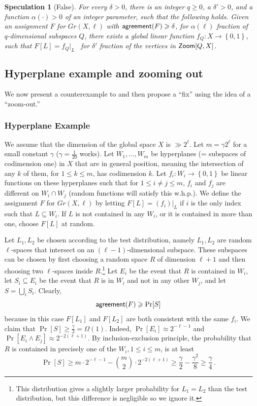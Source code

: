 \documentclass{toc}
\newtheorem{spec}[theorem]{Speculation}
\newcommand\set[1]{{\left\{ #1 \right\}}}
\renewcommand\geq{\geqslant}
\renewcommand\ge{\geqslant}
\renewcommand\leq{\leqslant}
\renewcommand\subset{\subseteq}
\newcommand{\Zoom}{{\sf Zoom}}
\def\agr{{\sf agreement}}
\begin{document}
\begin{spec}[False]\label{spec:2} For every %
 $\delta>0$, there
  is an integer $q \geq 0$, a
   $\delta' > 0$, and a function
 $\alpha(\cdot) > 0$ of an integer parameter,
 such that
the following holds. Given an assignment $F$ for $Gr(X,\ell)$ with $\agr(F)\ge\delta$, for $\alpha(\ell)$ fraction of $q$-dimensional subspaces $Q$,
there exists a global linear function $f_Q \colon X \to \set{0,1}$,
such that $F[L] = f_Q|_L$ ~for $\delta'$
fraction of the vertices in ${\Zoom}[Q, X]$.
\end{spec}


%
\subsection{Hyperplane example and zooming out}  %
\label{sec:counter-2}

We now present a counterexample to  and then propose a ``fix'' using the idea of a ``zoom-out.''

\subsubsection*{Hyperplane Example}
We assume that the dimension of the global space $X$ is $\gg 2^\ell$.
Let $m = \gamma 2^{\ell}$ for a small constant $\gamma$
($\gamma = \frac{1}{20}$ works). Let $W_1,...,W_{m}$ be hyperplanes (=
subspaces of codimension one) in $X$ that are in general position,
meaning the intersection of any $k$ of them, for $1 \leq k \leq m$,
has codimension $k$.  Let $f_i\colon W_i\to\set{0,1}$ be linear
functions on these hyperplanes such that for $1 \leq i\not=j \leq m$,
$f_i$ and $f_j$ are different on $W_i \cap W_j$ (random functions will
satisfy this w.h.p.).  We define the assignment $F$ for $Gr(X,\ell)$
by letting $F[L] = (f_i)|_{L}$ if $i$ is the only index such
that $L\subset W_i$. If $L$ is not contained in any $W_i$, or it is
contained in more than one, choose $F[L]$ at random.

Let $L_1,L_2$ be chosen according to the test distribution, namely $L_1,L_2$ are  random $\ell$-spaces that intersect on an
$(\ell-1)$-dimensional subspace. These subspaces can be chosen by first choosing a random space $R$ of dimension $\ell+1$ and then choosing two $\ell$-spaces inside $R$.\footnote{This distribution gives a slightly larger probability for $L_1=L_2$ than the test distribution, but this difference is negligible so we ignore it.}
Let $E_i$ be the event that $R$ is contained in $W_i$, let $S_i\subset E_i$ be the event that $R$ is in $W_i$ and not in any other $W_j$, and let $S = \bigcup_i S_i$. Clearly, \[\agr(F) \ge \Pr[S] \]
because in this case $F[L_1]$ and $F[L_2]$ are both consistent with the same $f_i$.
We claim that $\Pr[S]\ge \frac{\gamma}{2} = \Omega(1)$. Indeed, $\Pr[E_i] \approx 2^{-\ell-1}$ and $\Pr[E_i \wedge E_j]\approx 2^{-2(\ell+1)}$. By inclusion-exclusion principle, the probability that $R$ is contained in precisely one of the
$W_i, 1 \leq i \leq m$, is at least
 \[
 \Pr[S] \ge m \cdot 2^{-\ell-1}  - {m \choose 2} \cdot 2^{-2(\ell+1)} \ge \frac{\gamma}{2} - \frac{\gamma^2}{8} \geq \frac{\gamma}{4}
 \,.
 \]
\end{document}
